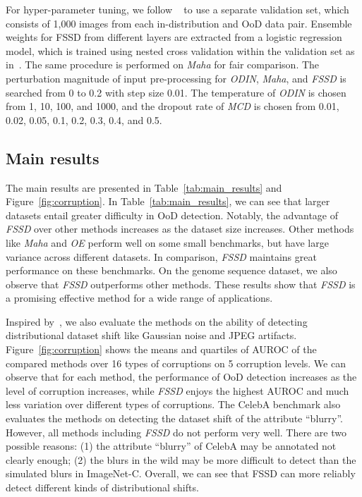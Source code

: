 \documentclass[letterpaper]{article}
\begin{document}
For hyper-parameter tuning, we follow ~\cite{mahalanobis, ren2019likelihood, odin} to use a separate validation set, which consists of 1,000 images from each  in-distribution and OoD data pair.
Ensemble weights  for FSSD from different layers are extracted from a logistic regression model, which is trained using nested cross validation within the validation set as in~\cite{mahalanobis, ma2018characterizing}.
The same procedure is performed on \textit{Maha} for fair comparison.
The perturbation magnitude  of input pre-processing for \textit{ODIN}, \textit{Maha}, and \textit{FSSD} is searched from 0 to 0.2 with step size 0.01.
The temperature  of \textit{ODIN} is chosen from 1, 10, 100, and 1000, and the dropout rate of \textit{MCD} is chosen from 0.01, 0.02, 0.05, 0.1, 0.2, 0.3, 0.4, and 0.5.


\subsection{Main results}
The main results are presented in Table~\ref{tab:main_results} and Figure~\ref{fig:corruption}. 
In Table~\ref{tab:main_results}, we can see that larger datasets entail greater difficulty in OoD detection.
Notably, the advantage of \textit{FSSD} over other methods increases as the dataset size increases. Other methods like \textit{Maha} and \textit{OE} perform well on some small benchmarks, but have large variance across different datasets.
In comparison, \textit{FSSD} maintains great performance on these benchmarks.
On the genome sequence dataset, we also observe that \textit{FSSD} outperforms other methods.
These results show that \textit{FSSD} is a promising effective method  for a wide range of applications.


Inspired by~\cite{Ovadia2019CanYT}, we also evaluate the methods on the ability of detecting distributional dataset shift like Gaussian noise and JPEG artifacts.
Figure~\ref{fig:corruption} shows the means and quartiles of AUROC of the compared methods over 16 types of corruptions on 5 corruption levels.
We can observe that for each method, the performance of OoD detection increases as the level of corruption increases, while \textit{FSSD} enjoys the highest AUROC and much less variation over different types of corruptions.
The CelebA benchmark also evaluates the methods on detecting the dataset shift of the attribute ``blurry''.
However, all methods including \textit{FSSD} do not perform very well.
There are two possible reasons: (1) the attribute ``blurry'' of CelebA may be annotated not clearly enough; (2) the blurs in the wild may be more difficult to detect than the simulated blurs in ImageNet-C.
Overall, we can see that FSSD can more reliably detect different kinds of distributional shifts.
\end{document}
